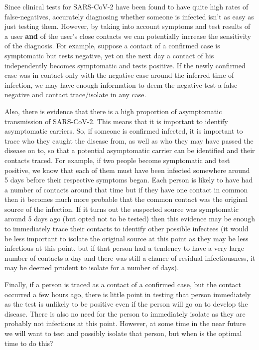 \documentclass{article}
\begin{document}
Since clinical tests for SARS-CoV-2 have been found to have quite high rates of false-negatives\cite{fang2020sensitivity}, accurately diagnosing whether someone is infected isn't as easy as just testing them. However, by taking into account symptoms and test results of a user \textbf{and} of the user's close contacts we can potentially increase the sensitivity of the diagnosis. For example, suppose a contact of a confirmed case is symptomatic but tests negative, yet on the next day a contact of his independently becomes symptomatic and tests positive. If the newly confirmed case was in contact only with the negative case around the inferred time of infection, we may have enough information to deem the negative test a false-negative and contact trace/isolate in any case.

Also, there is evidence that there is a high proportion of asymptomatic transmission of SARS-CoV-2\cite{lavezzo2020suppression}. This means that it is important to identify asymptomatic carriers. So, if someone is confirmed infected, it is important to trace who they caught the disease from, as well as who they may have passed the disease on to, so that a potential asymptomatic carrier can be identified and their contacts traced. For example, if two people become symptomatic and test positive, we know that each of them must have been infected somewhere around 5 days before their respective symptoms began. Each person is likely to have had a number of contacts around that time but if they have one contact in common then it becomes much more probable that the common contact was the original source of the infection. If it turns out the suspected source was symptomatic around 5 days ago (but opted not to be tested) then this evidence may be enough to immediately trace their contacts to identify other possible infectees (it would be less important to isolate the original source at this point as they may be less infectious at this point, but if that person had a tendency to have a very large number of contacts a day and there was still a chance of residual infectiousness, it may be deemed prudent to isolate for a number of days).

Finally, if a person is traced as a contact of a confirmed case, but the contact occurred a few hours ago, there is little point in testing that person immediately as the test is unlikely to be positive even if the person will go on to develop the disease. There is also no need for the person to immediately isolate as they are probably not infectious at this point. However, at some time in the near future we will want to test and possibly isolate that person, but when is the optimal time to do this?
\end{document}
